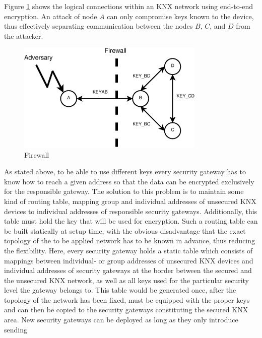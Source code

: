 Figure \ref{fig:firewall} shows the logical connections within an KNX network using end-to-end encryption. An 
attack of node $A$ can only compromise keys known to the device, thus effectively separating communication between the nodes $B$, $C$, and $D$ from
the attacker. 
\begin{figure}
    \includegraphics[width=0.8\textwidth]{figures/firewall2.eps}
% 
 \caption{Firewall}
 \label{fig:firewall}
\end{figure}
As stated above, to be able to use different keys every security gateway has to know how to reach a given address so that the data can be encrypted
exclusively for the responsible gateway. The solution to this problem is to maintain some kind of routing table, mapping group and individual addresses of unsecured
KNX devices to individual addresses of responsible security gateways. Additionally, this table must hold the key that will be used for encryption.
Such a routing table can be built statically at setup time, with the obvious disadvantage
that the exact topology of the to be applied network has to be known in advance, thus reducing the flexibility. Here, every security gateway holds a static 
table which consists of mappings between individual- or group addresses of unsecured KNX devices and individual addresses of security gateways at the border
between the secured and the unsecured KNX network, as well as all keys used for the particular security level the gateway belongs to.
This table would be generated once, after the topology of the network has been fixed, must be equipped with the proper keys and can then
be copied to the security gateways constituting the secured KNX area. New security gateways can be deployed as long as they only introduce sending 
